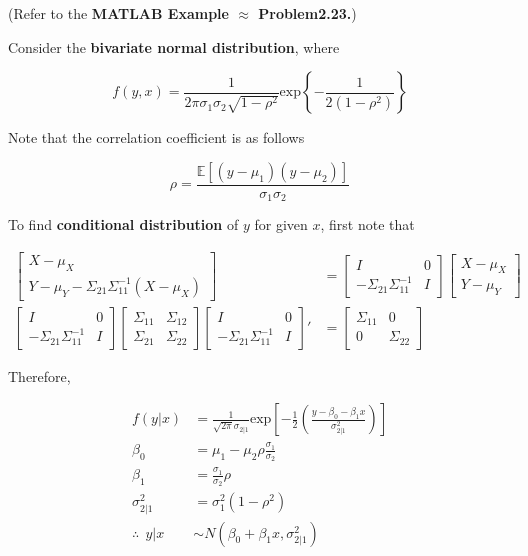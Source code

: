 \documentclass[12pt]{article}
\begin{document}
(Refer to the \textbf{MATLAB Example $\approx$ Problem2.23.})

Consider the \textbf{bivariate normal distribution}, where

$$
f(y,x) = \frac{1}{2 \pi \sigma_1 \sigma_2 \sqrt{1 - \rho^2}} \mathrm{exp} \left\{ -\frac{1}{2(1-\rho^2)} \right\}
$$

Note that the correlation coefficient is as follows

$$
\rho = \frac{\mathbb{E} \left[ (y- \mu_1)(y- \mu_2) \right]}{\sigma_1 \sigma_2}
$$

To find \textbf{conditional distribution} of $y$ for given $x$, first note that 

$$
\begin{aligned}
\begin{bmatrix} X - \mu_X \\ Y - \mu_Y - \Sigma_{21} \Sigma_{11}^{-1} (X - \mu_X) \end{bmatrix} &= \begin{bmatrix} I & 0 \\  - \Sigma_{21} \Sigma_{11}^{-1} & I \end{bmatrix}  \begin{bmatrix} X - \mu_X \\ Y - \mu_Y \end{bmatrix} \\[10pt]
\begin{bmatrix} I & 0 \\  - \Sigma_{21} \Sigma_{11}^{-1} & I \end{bmatrix} \begin{bmatrix} \Sigma_{11} & \Sigma_{12} \\ \Sigma_{21} & \Sigma_{22} \end{bmatrix} \begin{bmatrix} I & 0 \\  - \Sigma_{21} \Sigma_{11}^{-1} & I \end{bmatrix}' &= \begin{bmatrix} \Sigma_{11} & 0 \\ 0 & \Sigma_{22} \end{bmatrix}
\end{aligned}
$$


\bigskip
Therefore, 

$$
\begin{aligned}
f(y | x) &= \frac{1}{\sqrt{2 \pi} \sigma_{2|1}} \mathrm{exp} \left[  -\frac{1}{2} \left( \frac{y - \beta_0 - \beta_1x}{\sigma_{2|1}^2} \right) \right] \\[8pt]
\beta_0 &= \mu_1 - \mu_2 \rho \frac{\sigma_1}{\sigma_2} \\[8pt]
\beta_1 &= \frac{\sigma_1}{\sigma_2} \rho \\[8pt]
\sigma_{2|1}^2 &= \sigma_1^2 (1- \rho^2) \\[10pt]
\therefore \ \ y|x &\sim N\left( \beta_0 + \beta_1 x, \sigma_{2|1}^2 \right)
\end{aligned}
$$
\end{document}
